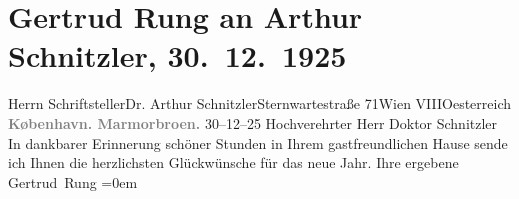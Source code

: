 

         
         \renewcommand{\erwaehntePersonen}{Personen: Georg Brandes}
         \renewcommand{\erwaehnteOrte}{Orte: Kopenhagen, Marmorbroen, Sternwartestraße, VIII., Josefstadt, Wien, Österreich}
         \renewcommand{\erwaehnteWerke}{}
               \section[Gertrud Rung an Arthur Schnitzler, 30. 12. 1925]{ Gertrud Rung an Arthur Schnitzler, 30. 12. 1925}\nopagebreak{}\rehead{ }\begin{ledgroupsized}[t]{13cm}\normalsize\beginnumbering \toendnotes[C]{\smallbreak\pagebreak[2]} 
\pstart{}{\pb}Herrn
                        Schriftsteller\pend{}\pstart{}Dr. Arthur Schnitzler\pend{}\pstart{}Sternwartestraße 71\pend{}\pstart{}Wien VIII\pend{}\pstart{}Oesterreich\pend{}{\bigskip}\pstart
           \noindent{}\centering{}\textcolor{gray}{\textbf{{\pb}København.
                            Marmorbroen.}}\pend
           \pstart
           {\pb}30–12–25\pend
           \pstart{}Hochverehrter Herr Doktor Schnitzler\pend\pstart
           In dankbarer Erinnerung schöner Stunden in Ihrem gastfreundlichen Hause sende ich
                    Ihnen die herzlichsten Glückwünsche für das neue Jahr.\pend
           \pstart
           Ihre ergebene{\\[\baselineskip]}\spacefill\mbox{Gertrud Rung}\pend
           \leftskip=0em{}
         
         \endnumbering{}\end{ledgroupsized}  \newcommand{\dateiname}{L02463}\newcommand{\titel}{Gertrud Rung an Arthur Schnitzler, 30. 12. 1925}\newcommand{\editorInnen}{Martin Anton Müller und Gerd-Hermann Susen}
      